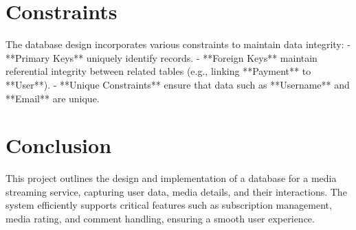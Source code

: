 \documentclass[13pt]{article}
\begin{document}
\section{Constraints}
The database design incorporates various constraints to maintain data integrity:
- **Primary Keys** uniquely identify records.
- **Foreign Keys** maintain referential integrity between related tables (e.g., linking **Payment** to **User**).
- **Unique Constraints** ensure that data such as **Username** and **Email** are unique.

\section{Conclusion}
This project outlines the design and implementation of a database for a media streaming service, capturing user data, media details, and their interactions. The system efficiently supports critical features such as subscription management, media rating, and comment handling, ensuring a smooth user experience.
\end{document}
